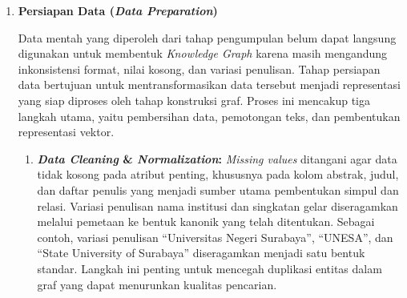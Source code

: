 \begin{enumerate}[label=\textbf{\arabic*.}, leftmargin=*, itemsep=10pt, listparindent=0.75cm]
\begin{enumerate}[label=\textbf{\alph*.}, leftmargin=0.75cm, itemsep=5pt, listparindent=0.75cm]
              \item \textbf{Data Publikasi Dosen}

                    Data publikasi dikumpulkan untuk melengkapi informasi pada simpul dosen dengan menyertakan karya ilmiah yang telah dihasilkan. Data ini diperoleh dari \textit{SciVal} dan \textit{Google Scholar} dengan memanfaatkan \textit{SciVal ID} dan \textit{Scholar ID} yang telah teridentifikasi pada tahap sebelumnya. Jenis publikasi yang dikumpulkan mencakup artikel jurnal, makalah konferensi, dan prosiding yang memenuhi kriteria kelayakan data. Setiap publikasi dilengkapi dengan metadata seperti judul, tahun terbit, nama jurnal atau konferensi, daftar penulis, abstrak, kata kunci, DOI, dan ringkasan TLDR yang dihasilkan menggunakan \textit{LLM}. Penanganan duplikasi publikasi dari kedua sumber dilakukan dengan mencocokkan DOI dan judul publikasi untuk memastikan setiap entri bersifat unik. Hasil yang terkumpul disimpan ke dalam basis data sebagai dasar pembentukan simpul publikasi dan relasi publikasi--penulis.

          \end{enumerate}

    \item \textbf{Persiapan Data (\textit{Data Preparation})}

          Data mentah yang diperoleh dari tahap pengumpulan belum dapat langsung digunakan untuk membentuk \textit{Knowledge Graph} karena masih mengandung inkonsistensi format, nilai kosong, dan variasi penulisan. Tahap persiapan data bertujuan untuk mentransformasikan data tersebut menjadi representasi yang siap diproses oleh tahap konstruksi graf. Proses ini mencakup tiga langkah utama, yaitu pembersihan data, pemotongan teks, dan pembentukan representasi vektor.

          \begin{enumerate}[label=\textbf{\alph*.}, leftmargin=0.75cm, itemsep=4pt, listparindent=0.75cm]
              \item \textbf{\textit{Data Cleaning} \& \textit{Normalization}:} \textit{Missing values} ditangani agar data tidak kosong pada atribut penting, khususnya pada kolom abstrak, judul, dan daftar penulis yang menjadi sumber utama pembentukan simpul dan relasi. Variasi penulisan nama institusi dan singkatan gelar diseragamkan melalui pemetaan ke bentuk kanonik yang telah ditentukan. Sebagai contoh, variasi penulisan ``Universitas Negeri Surabaya'', ``UNESA'', dan ``State University of Surabaya'' diseragamkan menjadi satu bentuk standar. Langkah ini penting untuk mencegah duplikasi entitas dalam graf yang dapat menurunkan kualitas pencarian.


\end{enumerate}
\end{enumerate}
